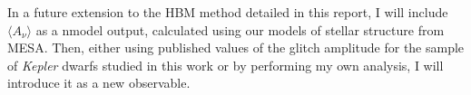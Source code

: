 In a future extension to the HBM method detailed in this report, I will include $\langle A_\nu \rangle$ as a nmodel output, calculated using our models of stellar structure from MESA. Then, either using published values of the glitch amplitude for the sample of \emph{Kepler} dwarfs studied in this work \citep[e.g.][]{Verma.Raodeo.ea2017} or by performing my own analysis, I will introduce it as a new observable.


